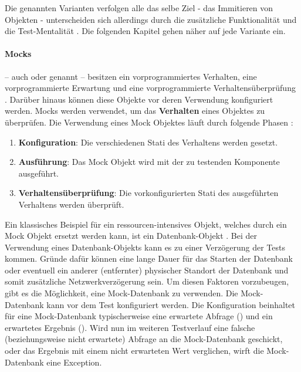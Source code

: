 Die genannten Varianten verfolgen alle das selbe Ziel - das Immitieren von Objekten - unterscheiden sich allerdings durch die zusätzliche Funktionalität und die Test-Mentalität \autocite{Fowler:Mocks}. Die folgenden Kapitel gehen näher auf jede Variante ein.

\paragraph{Mocks}
 -- auch  oder  genannt -- besitzen ein vorprogrammiertes Verhalten, eine vorprogrammierte Erwartung und eine vorprogrammierte Verhaltensüberprüfung \autocite[453]{Johansen:2011}. Darüber hinaus können diese Objekte vor deren Verwendung konfiguriert werden. Mocks werden verwendet, um das \textbf{Verhalten} eines Objektes zu überprüfen. Die Verwendung eines Mock Objektes läuft durch folgende Phasen \autocite[453]{Johansen:2011}:
\begin{enumerate}
  \item \textbf{Konfiguration}: \newline
  Die verschiedenen Stati des Verhaltens werden gesetzt.
  \item \textbf{Ausführung}: \newline
  Das Mock Objekt wird mit der zu testenden Komponente ausgeführt.
  \item \textbf{Verhaltensüberprüfung}: \newline
  Die vorkonfigurierten Stati des ausgeführten Verhaltens werden überprüft.
\end{enumerate}

Ein klassisches Beispiel für ein ressourcen-intensives Objekt, welches durch ein Mock Objekt ersetzt werden kann, ist ein Datenbank-Objekt \autocite[144]{Beck:2003}. Bei der Verwendung eines Datenbank-Objekts kann es zu einer Verzögerung der Tests kommen. Gründe dafür können eine lange Dauer für das Starten der Datenbank oder eventuell ein anderer (entfernter) physischer Standort der Datenbank und somit zusätzliche Netzwerkverzögerung sein. Um diesen Faktoren vorzubeugen, gibt es die Möglichkeit, eine Mock-Datenbank zu verwenden. Die Mock-Datenbank kann vor dem Test konfiguriert werden. Die Konfiguration beinhaltet für eine Mock-Datenbank typischerweise eine erwartete Abfrage () und ein erwartetes Ergebnis (). Wird nun im weiteren Testverlauf eine falsche (beziehungsweise nicht erwartete) Abfrage an die Mock-Datenbank geschickt, oder das Ergebnis mit einem nicht erwarteten Wert verglichen, wirft die Mock-Datenbank eine Exception.

